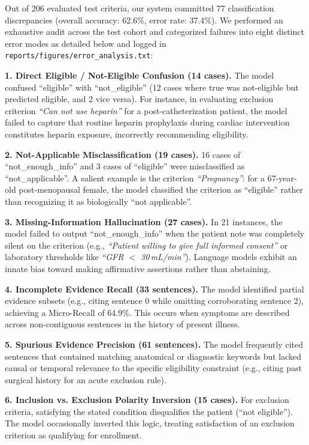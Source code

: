 \documentclass[conference]{IEEEtran}
\begin{document}
Out of 206 evaluated test criteria, our system committed 77 classification discrepancies (overall accuracy: 62.6\%, error rate: 37.4\%). We performed an exhaustive audit across the test cohort and categorized failures into eight distinct error modes as detailed below and logged in \texttt{reports/figures/error\_analysis.txt}:

\textbf{1. Direct Eligible / Not-Eligible Confusion (14 cases).} The model confused ``eligible'' with ``not\_eligible'' (12 cases where true was not-eligible but predicted eligible, and 2 vice versa). For instance, in evaluating exclusion criterion \textit{``Can not use heparin''} for a post-catheterization patient, the model failed to capture that routine heparin prophylaxis during cardiac intervention constitutes heparin exposure, incorrectly recommending eligibility.

\textbf{2. Not-Applicable Misclassification (19 cases).} 16 cases of ``not\_enough\_info'' and 3 cases of ``eligible'' were misclassified as ``not\_applicable''. A salient example is the criterion \textit{``Pregnancy''}: for a 67-year-old post-menopausal female, the model classified the criterion as ``eligible'' rather than recognizing it as biologically ``not applicable''.

\textbf{3. Missing-Information Hallucination (27 cases).} In 21 instances, the model failed to output ``not\_enough\_info'' when the patient note was completely silent on the criterion (e.g., \textit{``Patient willing to give full informed consent''} or laboratory thresholds like \textit{``GFR $<$ 30\,mL/min''}). Language models exhibit an innate bias toward making affirmative assertions rather than abstaining.

\textbf{4. Incomplete Evidence Recall (33 sentences).} The model identified partial evidence subsets (e.g., citing sentence 0 while omitting corroborating sentence 2), achieving a Micro-Recall of 64.9\%. This occurs when symptoms are described across non-contiguous sentences in the history of present illness.

\textbf{5. Spurious Evidence Precision (61 sentences).} The model frequently cited sentences that contained matching anatomical or diagnostic keywords but lacked causal or temporal relevance to the specific eligibility constraint (e.g., citing past surgical history for an acute exclusion rule).

\textbf{6. Inclusion vs. Exclusion Polarity Inversion (15 cases).} For exclusion criteria, satisfying the stated condition disqualifies the patient (``not eligible''). The model occasionally inverted this logic, treating satisfaction of an exclusion criterion as qualifying for enrollment.
\end{document}
